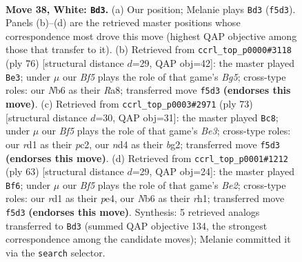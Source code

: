 \documentclass[11pt]{article}
\begin{document}
\clearpage

\begin{figure}[p]\centering
\begin{subfigure}{0.46\textwidth}\centering
\resizebox{\linewidth}{!}{%
\newchessgame
\chessboard[
  setfen={8/6k1/1N6/4pBp1/3n1p2/5P2/2P2K2/3r4 w - - 4 38},
  showmover=false,
  pgfstyle=straightmove, color=movearrow, markmove={f5-d3}
]}
\caption{}
\end{subfigure}\hfill
\begin{subfigure}{0.46\textwidth}\centering
\resizebox{\linewidth}{!}{%
\newchessgame
\chessboard[
  setfen={R7/5kp1/8/3r1pB1/4n3/6PP/5P1K/8 w - - 6 39},
  showmover=false,
  pgfstyle=straightmove, color=movearrow, markmove={g5-e3}
]}
\caption{}
\end{subfigure}
\\[4pt]
\begin{subfigure}{0.46\textwidth}\centering
\resizebox{\linewidth}{!}{%
\newchessgame
\chessboard[
  setfen={1k6/8/p2nb3/1pNp4/1P6/P7/2P3B1/1K6 b - - 1 37},
  showmover=false,
  pgfstyle=straightmove, color=movearrow, markmove={e6-c8}
]}
\caption{}
\end{subfigure}\hfill
\begin{subfigure}{0.46\textwidth}\centering
\resizebox{\linewidth}{!}{%
\newchessgame
\chessboard[
  setfen={1r6/3kbpp1/3p4/1P1N4/2P1P3/6K1/8/7R b - - 0 32},
  showmover=false,
  pgfstyle=straightmove, color=movearrow, markmove={e7-f6}
]}
\caption{}
\end{subfigure}
\caption{\textbf{Move 38, White: \texttt{Bd3}.} (a) Our position; Melanie plays \texttt{Bd3} (\texttt{f5d3}). Panels (b)--(d) are the retrieved master positions whose correspondence most drove this move (highest QAP objective among those that transfer to it). (b) Retrieved from \texttt{ccrl\_top\_p0000\#3118} (ply 76) [structural distance $d$=29, QAP obj=42]: the master played \texttt{Be3}; under $\mu$ our \emph{Bf5} plays the role of that game's \emph{Bg5}; cross-type roles: our \emph{N}b6 as their \emph{R}a8; transferred move \texttt{f5d3} \textbf{(endorses this move)}. (c) Retrieved from \texttt{ccrl\_top\_p0003\#2971} (ply 73) [structural distance $d$=30, QAP obj=31]: the master played \texttt{Bc8}; under $\mu$ our \emph{Bf5} plays the role of that game's \emph{Be3}; cross-type roles: our \emph{r}d1 as their \emph{p}c2, our \emph{n}d4 as their \emph{b}g2; transferred move \texttt{f5d3} \textbf{(endorses this move)}. (d) Retrieved from \texttt{ccrl\_top\_p0001\#1212} (ply 63) [structural distance $d$=29, QAP obj=24]: the master played \texttt{Bf6}; under $\mu$ our \emph{Bf5} plays the role of that game's \emph{Be2}; cross-type roles: our \emph{r}d1 as their \emph{p}e4, our \emph{N}b6 as their \emph{r}h1; transferred move \texttt{f5d3} \textbf{(endorses this move)}. Synthesis: 5 retrieved analogs transferred to \texttt{Bd3} (summed QAP objective 134, the strongest correspondence among the candidate moves); Melanie committed it via the \texttt{search} selector.}
\label{fig:thought-m74}
\end{figure}
\end{document}
